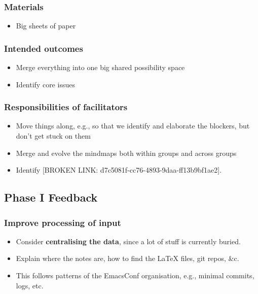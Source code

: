 \documentclass[11pt]{article}
\begin{document}
\subsubsection{Materials}
\label{sec:orgadc9bfb}
\begin{itemize}
\item Big sheets of paper
\end{itemize}

\subsubsection{Intended outcomes}
\label{sec:org4fa3470}
\begin{itemize}
\item Merge everything into one big shared possibility space
\item Identify core issues
\end{itemize}

\subsubsection{Responsibilities of facilitators}
\label{sec:orga892e45}

\begin{itemize}
\item Move things along, e.g., so that we identify and elaborate the blockers, but don’t get stuck on them
\item Merge and evolve the mindmaps both within groups and across groups
\item Identify [BROKEN LINK: d7c5081f-cc76-4893-9daa-ff13b9bf1ae2].
\end{itemize}

\subsection{Phase I Feedback}
\label{sec:orgcd3764e}

\subsubsection{Improve processing of input}
\label{sec:orgc1aa67e}
\begin{itemize}
\item Consider \textbf{centralising the data}, since a lot of stuff is currently buried.
\item Explain where the notes are, how to find the \LaTeX{} files, git repos, \&c.
\item This follows patterns of the EmacsConf organisation, e.g., minimal commits, logs, etc.
\end{itemize}
\end{document}
